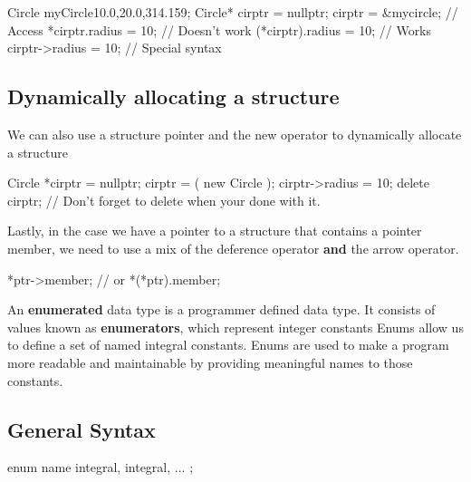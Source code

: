 \documentclass{report}
\begin{document}
	\begin{cppcode}
Circle myCircle{10.0,20.0,314.159};
Circle* cirptr = nullptr;
cirptr = &mycircle;
// Access
*cirptr.radius = 10; // Doesn't work
(*cirptr).radius = 10; // Works
cirptr->radius = 10; // Special syntax
	\end{cppcode}
	
	\bigbreak \noindent 

	\bigbreak \noindent 
	\subsection{Dynamically allocating a structure}
	\bigbreak \noindent 
	We can also use a structure pointer and the new operator to dynamically allocate a structure
	\bigbreak \noindent 
	
	\begin{cppcode}
Circle *cirptr = nullptr;
cirptr = ( new Circle );
cirptr->radius = 10;
delete cirptr; // Don't forget to delete when your done with it.
	\end{cppcode}
	
	\bigbreak \noindent 
	
	\bigbreak \noindent 
	Lastly, in the case we have a pointer to a structure that contains a pointer member, we need to use a mix of the deference operator \textbf{and} the arrow operator. 
	\bigbreak \noindent 
	
	\begin{cppcode}
*ptr->member;
// or
*(*ptr).member;
	\end{cppcode}
	

	\pagebreak
	\bigbreak \noindent 
	\begin{concept}
	   An \textbf{enumerated} data type is a programmer defined data type. It consists of values known as \textbf{enumerators}, which represent integer constants 
       \bigbreak \noindent 
       Enums allow us to define a set of named integral constants. Enums are used to make a program more readable and maintainable by providing meaningful names to those constants.
	\end{concept}
	\bigbreak \noindent 
    \subsection{General Syntax}
    \bigbreak \noindent 
    \begin{cppcode}
        enum name {
            integral, integral, ...
        };

    \end{cppcode}
    \bigbreak \noindent 
\end{document}
